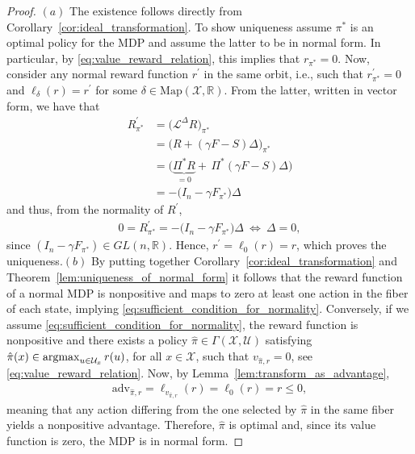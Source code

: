 \documentclass[10pt,leqno]{amsart}
\newcommand{\gln}{GL(n, \R)}
\newcommand{\argmax}{\mathop{\rm argmax}}
\newcommand{\R}{\mathbb{R}}
\newcommand{\U}{\mathcal{U}}
\newcommand{\X}{\mathcal{X}}
\newcommand{\cost}{r}
\newcommand{\costfb}[1]{\cost_{#1}}
\newcommand{\vvarg}[1]{v_{#1}}
\newcommand{\Cost}{R}
\newcommand{\Costfb}[1]{\Cost_{#1}}
\newcommand{\F}{F}
\newcommand{\Ffb}[1]{\F_{#1}}
\newcommand{\policy}{\pi}
\newcommand{\Sect}{\Gamma(\X, \U)}
\newcommand{\state}{x} %
\newcommand{\act}{u}   %
\newcommand{\disc}{\gamma}
\newcommand{\Proj}{S}
\newcommand{\maps}{\text{Map}}
\newcommand{\actAdvsym}{\ell}
\newcommand{\actAdv}[1]{\actAdvsym_{#1}}
\newcommand{\advsym}{\text{adv}}
\newcommand{\adv}[2]{\advsym_{#1, #2}}
\begin{document}
\begin{proof}
    $(a)$ The existence follows directly from Corollary~\ref{cor:ideal_transformation}. To show uniqueness assume $\policy^*$ is an optimal policy for the MDP and assume the latter to be in normal form. In particular, by \eqref{eq:value_reward_relation}, this implies that $\costfb{\policy^*} = 0$. Now, consider any normal reward function $\cost^\prime$ in the same orbit, i.e., such that $\costfb{\policy^*}^\prime = 0$ and $\actAdv{\delta}(\cost) = \cost^\prime$ for some $\delta \in \maps(\X, \R)$. From the latter, written in vector form, we have that
    \begin{align*}
        \Costfb{\policy^*}^\prime &= \bigl( \mathcal{L}^{\Delta}\Cost \bigr)_{\policy^*}\\
        &= \bigl( \Cost + \left( \disc \F - \Proj \right) \Delta \bigr)_{\policy^*}\\
        &= \bigl( \underbrace{\Pi^*\Cost}_{= 0} + \,\Pi^*\!\left( \disc \F - \Proj \right) \Delta \bigr)\\
        &= -\bigl( I_n - \disc \Ffb{\policy^*} \bigr) \Delta
    \end{align*}
    and thus, from the normality of $\Cost^\prime$,
    \begin{align*}
        0 = \Costfb{\policy^*}^\prime = -\bigl( I_n - \disc \Ffb{\policy^*} \bigr) \Delta ~\Longleftrightarrow~ \Delta = 0,
    \end{align*}
    since $(I_n - \disc \F_{\policy^*}) \in \gln$. Hence, $\cost^\prime = \actAdv{0}(\cost) = \cost$, which proves the uniqueness.\newline $(b)$ By putting together Corollary~\ref{cor:ideal_transformation} and Theorem~\ref{lem:uniqueness_of_normal_form} it follows that the reward function of a normal MDP is nonpositive and maps to zero at least one action in the fiber of each state, implying \eqref{eq:sufficient_condition_for_normality}. Conversely, if we assume \eqref{eq:sufficient_condition_for_normality}, the reward function is nonpositive and there exists a policy $\hat{\policy} \in \Sect$ satisfying $\hat{\policy}(\state) \in \argmax_{\act \in \U_\state} \cost(\act)$, for all $\state \in \X$, such that $\vvarg{\hat{\policy}, \cost} = 0$, see \eqref{eq:value_reward_relation}. Now, by Lemma~\ref{lem:transform_as_advantage},
    \begin{align*}
        \adv{\hat{\policy}}{\cost} = \actAdv{\vvarg{\hat{\policy}, \cost}}(\cost) = \actAdv{0}(\cost) = \cost \leq 0,
    \end{align*}
    meaning that any action differing from the one selected by $\hat{\policy}$ in the same fiber yields a nonpositive advantage. Therefore, $\hat{\policy}$ is optimal and, since its value function is zero, the MDP is in normal form.
\end{proof}
\end{document}
